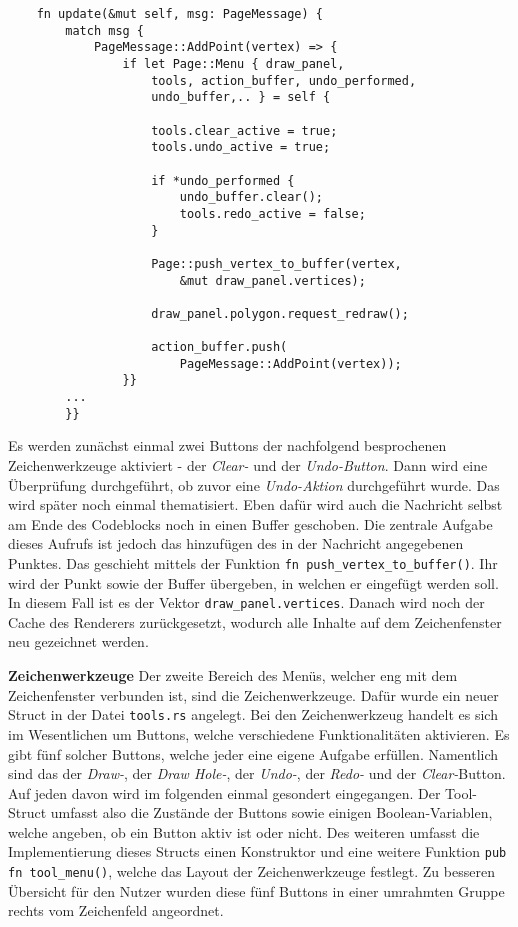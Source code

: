 \begin{lstlisting}
    fn update(&mut self, msg: PageMessage) {
        match msg {
            PageMessage::AddPoint(vertex) => {
                if let Page::Menu { draw_panel, 
                    tools, action_buffer, undo_performed, 
                    undo_buffer,.. } = self {

                    tools.clear_active = true;
                    tools.undo_active = true;
                    
                    if *undo_performed {
                        undo_buffer.clear();
                        tools.redo_active = false;
                    }

                    Page::push_vertex_to_buffer(vertex, 
                        &mut draw_panel.vertices);            
                    
                    draw_panel.polygon.request_redraw();

                    action_buffer.push(
                        PageMessage::AddPoint(vertex));     
                }}
        ...
        }}
\end{lstlisting}
Es werden zunächst einmal zwei Buttons der nachfolgend besprochenen Zeichenwerkzeuge aktiviert - der \emph{Clear-} und der \emph{Undo-Button}. Dann wird eine Überprüfung durchgeführt, ob zuvor eine \emph{Undo-Aktion} 
durchgeführt wurde. Das wird später noch einmal thematisiert. Eben dafür wird auch die Nachricht selbst am Ende des Codeblocks noch in einen Buffer geschoben.
Die zentrale Aufgabe dieses Aufrufs ist jedoch das hinzufügen des in der Nachricht angegebenen Punktes. Das geschieht mittels der Funktion \lstinline{fn push_vertex_to_buffer()}. Ihr wird 
der Punkt sowie der Buffer übergeben, in welchen er eingefügt werden soll. In diesem Fall ist es der Vektor \lstinline{draw_panel.vertices}. Danach wird noch der Cache des Renderers zurückgesetzt, wodurch alle Inhalte auf dem 
Zeichenfenster neu gezeichnet werden.\linebreak

\textbf{Zeichenwerkzeuge}\linebreak
Der zweite Bereich des Menüs, welcher eng mit dem Zeichenfenster verbunden ist, sind die Zeichenwerkzeuge. Dafür wurde ein neuer Struct in der Datei \lstinline{tools.rs} angelegt.  Bei den Zeichenwerkzeug handelt es sich im Wesentlichen um Buttons, welche verschiedene Funktionalitäten aktivieren.
Es gibt fünf solcher Buttons, welche jeder eine eigene Aufgabe erfüllen. Namentlich sind das der \emph{Draw-}, der \emph{Draw Hole-}, der \emph{Undo-}, der \emph{Redo-} und der \emph{Clear-}Button. Auf jeden davon wird im folgenden einmal gesondert eingegangen.
Der Tool-Struct umfasst also die Zustände der Buttons sowie einigen Boolean-Variablen, welche angeben, ob ein Button aktiv ist oder nicht. Des weiteren umfasst die Implementierung dieses Structs einen Konstruktor und eine weitere Funktion \lstinline{pub fn tool_menu()}, welche das Layout der Zeichenwerkzeuge festlegt.
Zu besseren Übersicht für den Nutzer wurden diese fünf Buttons in einer umrahmten Gruppe rechts vom Zeichenfeld angeordnet.

